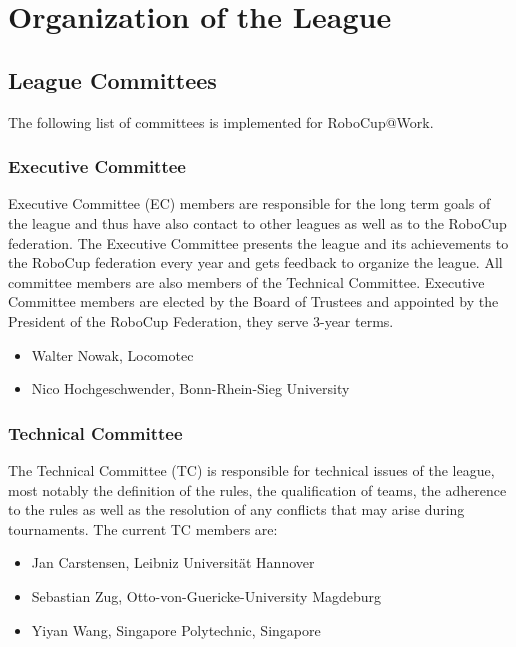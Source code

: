 \section{Organization of the League}\label{sec:organisation_of_the_league}

\subsection{League Committees}
The following list of committees is implemented for RoboCup@Work.

\subsubsection{Executive Committee}

Executive Committee (EC) members are responsible for the long term goals of the league and thus have also contact to other leagues as well as to the RoboCup federation. The Executive Committee presents the league and its achievements to the RoboCup federation every year and gets feedback to organize the league. All committee members are also members of the Technical Committee. Executive Committee members are elected by the Board of Trustees and appointed by the President of the RoboCup Federation, they serve 3-year terms.

\begin{itemize}
	\item Walter Nowak, Locomotec
	\item Nico Hochgeschwender, Bonn-Rhein-Sieg University
\end{itemize}


\subsubsection{Technical Committee}
The Technical Committee (TC) is responsible for technical issues of the league, most notably the definition of the rules, the qualification of teams, the adherence to the rules as well as the resolution of any conflicts that may arise during tournaments. The current TC members are:

\begin{itemize}
	\item Jan Carstensen, Leibniz Universit\"at Hannover
	\item Sebastian Zug, Otto-von-Guericke-University Magdeburg
	\item Yiyan Wang, Singapore Polytechnic, Singapore
\end{itemize}


